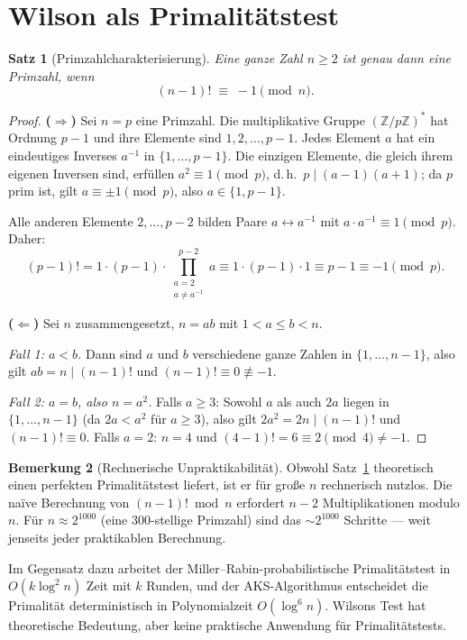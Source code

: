 \documentclass[12pt,a4paper]{amsart}
\newtheorem{theorem}{Satz}[section]
\theoremstyle{definition}
\newtheorem{bemerkung}[theorem]{Bemerkung}
\newcommand{\Z}{\mathbb{Z}}
\begin{document}
\section{Wilson als Primalitätstest}

\begin{theorem}[Primzahlcharakterisierung]\label{satz:primalitaet}
  Eine ganze Zahl $n \geq 2$ ist genau dann eine Primzahl, wenn
  \[
    (n-1)! \;\equiv\; -1 \pmod{n}.
  \]
\end{theorem}

\begin{proof}
  \textbf{($\Rightarrow$)} Sei $n = p$ eine Primzahl. Die multiplikative
  Gruppe $(\Z/p\Z)^*$ hat Ordnung $p-1$ und ihre Elemente sind $1, 2, \ldots, p-1$.
  Jedes Element $a$ hat ein eindeutiges Inverses $a^{-1}$ in $\{1, \ldots, p-1\}$.
  Die einzigen Elemente, die gleich ihrem eigenen Inversen sind, erfüllen
  $a^2 \equiv 1 \pmod{p}$, d.\,h.\ $p \mid (a-1)(a+1)$; da $p$ prim ist,
  gilt $a \equiv \pm 1 \pmod{p}$, also $a \in \{1, p-1\}$.

  Alle anderen Elemente $2, \ldots, p-2$ bilden Paare $a \leftrightarrow a^{-1}$
  mit $a \cdot a^{-1} \equiv 1 \pmod{p}$. Daher:
  \[
    (p-1)! = 1 \cdot (p-1) \cdot \prod_{\substack{a=2\\a \neq a^{-1}}}^{p-2} a
    \equiv 1 \cdot (p-1) \cdot 1 \equiv p-1 \equiv -1 \pmod{p}.
  \]

  \textbf{($\Leftarrow$)} Sei $n$ zusammengesetzt, $n = ab$ mit $1 < a \leq b < n$.

  \emph{Fall 1: $a < b$.} Dann sind $a$ und $b$ verschiedene ganze Zahlen in
  $\{1, \ldots, n-1\}$, also gilt $ab = n \mid (n-1)!$ und
  $(n-1)! \equiv 0 \not\equiv -1$.

  \emph{Fall 2: $a = b$, also $n = a^2$.}
  Falls $a \geq 3$: Sowohl $a$ als auch $2a$ liegen in $\{1, \ldots, n-1\}$
  (da $2a < a^2$ für $a \geq 3$), also gilt $2a^2 = 2n \mid (n-1)!$ und
  $(n-1)! \equiv 0$.
  Falls $a = 2$: $n = 4$ und $(4-1)! = 6 \equiv 2 \pmod{4} \neq -1$.
\end{proof}

\begin{bemerkung}[Rechnerische Unpraktikabilität]
  Obwohl Satz~\ref{satz:primalitaet} theoretisch einen perfekten Primalitätstest
  liefert, ist er für große $n$ rechnerisch nutzlos. Die naïve Berechnung von
  $(n-1)! \bmod n$ erfordert $n-2$ Multiplikationen modulo $n$.
  Für $n \approx 2^{1000}$ (eine 300-stellige Primzahl) sind das $\sim 2^{1000}$
  Schritte — weit jenseits jeder praktikablen Berechnung.

  Im Gegensatz dazu arbeitet der Miller--Rabin-probabilistische Primalitätstest
  in $O(k \log^2 n)$ Zeit mit $k$ Runden, und der AKS-Algorithmus
  \cite{Agrawal2004} entscheidet die Primalität deterministisch in
  Polynomialzeit $O(\log^{6} n)$. Wilsons Test hat theoretische Bedeutung,
  aber keine praktische Anwendung für Primalitätstests.
\end{bemerkung}
\end{document}
